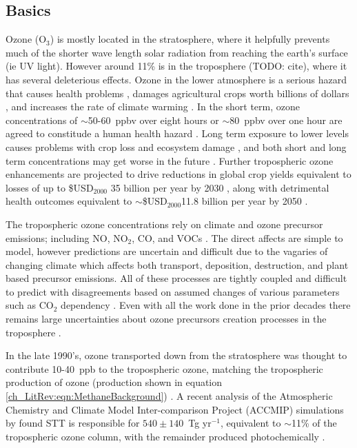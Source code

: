   \subsection{Basics}
    Ozone (O$_3$) is mostly located in the stratosphere, where it helpfully prevents much of the shorter wave length solar radiation from reaching the earth's surface (ie UV light).
    However around 11\% is in the troposphere (TODO: cite), where it has several deleterious effects.
    Ozone in the lower atmosphere is a serious hazard that causes health problems \citep{Hsieh2013}, damages agricultural crops worth billions of dollars \citep{Avnery2011}, and increases the rate of climate warming \citep{IPCC_2013_chap8}.
    In the short term, ozone concentrations of $\sim$50-60~ppbv over eight hours or $\sim$80~ppbv over one hour are agreed to constitude a human health hazard \citep{Ayers2006,Lelieveld2009}. 
    Long term exposure to lower levels causes problems with crop loss and ecosystem damage \citep{Emberson2003}, and both short and long term concentrations may get worse in the future \citep{Lelieveld2009, Stevenson2013}.
    Further tropospheric ozone enhancements are projected to drive reductions in global crop yields equivalent to losses of up to \$USD$_{2000}$ 35 billion per year by 2030 \citep{Avnery2011}, along with detrimental health outcomes equivalent to $\sim$\$USD$_{2000}$11.8 billion per year by 2050 \citep{Selin2009}.
    
    The tropospheric ozone concentrations rely on climate and ozone precursor emissions; including NO, NO$_2$, CO, and VOCs \citep{Atkinson2000, Young2013}. 
    The direct affects are simple to model, however predictions are uncertain and difficult due to the vagaries of changing climate which affects both transport, deposition, destruction, and plant based precursor emissions.
    All of these processes are tightly coupled and difficult to predict with disagreements based on assumed changes of various parameters such as CO$_2$ dependency \citep{Young2013}.
    Even with all the work done in the prior decades there remains large uncertainties about ozone precursors creation processes in the troposphere \citep{Mazzuca2016}.
    
    In the late 1990's, ozone transported down from the stratosphere was thought to contribute 10-40~ppb to the tropospheric ozone,  matching the tropospheric production of ozone (production shown in equation \ref{ch_LitRev:eqn:MethaneBackground}) \citep{Atkinson2000,Stohl2003}.
    A recent analysis of the Atmospheric Chemistry and Climate Model Inter-comparison Project (ACCMIP) simulations by \citet{Young2013} found STT is responsible for $540\pm140$~Tg yr$^{-1}$, equivalent to $\sim$11\% of the tropospheric ozone column, with the remainder produced photochemically \citep{Monks2015}.
    
